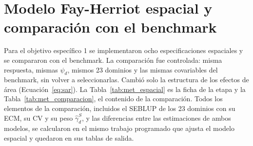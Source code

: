 \section{Modelo Fay-Herriot espacial y comparación con el benchmark}
\label{sec:met_espacial}

Para el objetivo específico 1 se implementaron ocho especificaciones espaciales y se compararon con el benchmark. La comparación fue controlada: misma respuesta, mismas $\psi_d$, mismos 23 dominios y las mismas covariables del benchmark, sin volver a seleccionarlas. Cambió solo la estructura de los efectos de área (Ecuación~\ref{eq:sar}). La Tabla~\ref{tab:met_espacial} es la ficha de la etapa y la Tabla~\ref{tab:met_comparacion}, el contenido de la comparación. Todos los elementos de la comparación, incluidos el SEBLUP de los 23 dominios con su ECM, su CV y su peso $\hat{\gamma}^{S}_d$, y las diferencias entre las estimaciones de ambos modelos, se calcularon en el mismo trabajo programado que ajusta el modelo espacial y quedaron en sus tablas de salida.

